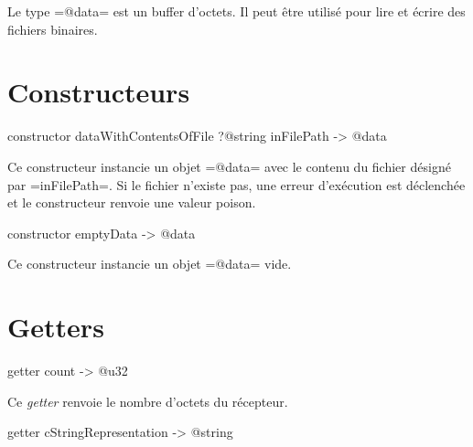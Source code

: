 



Le type \ggsq=@data= est un buffer d'octets. Il peut être utilisé pour lire et écrire des fichiers binaires.




\section{Constructeurs}



\begin{galgas4}
constructor dataWithContentsOfFile ?@string inFilePath -> @data
\end{galgas4}

Ce constructeur instancie un objet \ggsq=@data= avec le contenu du fichier désigné par \ggsq=inFilePath=. Si le fichier n'existe pas, une erreur d'exécution est déclenchée et le constructeur renvoie une valeur poison.





\begin{galgas4}
constructor emptyData -> @data
\end{galgas4}

Ce constructeur instancie un objet \ggsq=@data= vide.








\section{Getters}




\begin{galgas4}
getter count -> @u32
\end{galgas4}

Ce \emph{getter} renvoie le nombre d'octets du récepteur.



\begin{galgas4}
getter cStringRepresentation -> @string
\end{galgas4}

